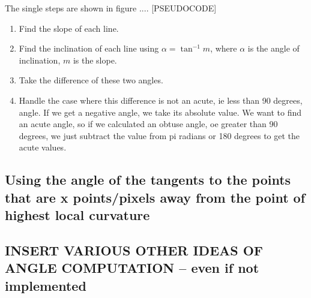The single steps are shown in figure ....
[PSEUDOCODE]
\begin{enumerate}
	\item Find the slope of each line.
	\item Find the inclination of each line using \( \alpha = \tan^{-1} m \), where  \( \alpha \) is the angle of inclination, \( m \) is the slope.
	\item Take the difference of these two angles.
	\item Handle the case where this difference is not an acute, ie less than 90 degrees, angle. If we get a negative angle, we take its absolute value. We want to find an acute angle, so if we calculated an obtuse angle, oe greater than 90 degrees, we just subtract the value from pi radians or 180 degrees to get the acute values.
\end{enumerate}


\subsection{Using the angle of the tangents to the points that are x points/pixels away from the point of highest local curvature}

\subsection{INSERT VARIOUS OTHER IDEAS OF ANGLE COMPUTATION -- even if not implemented}
